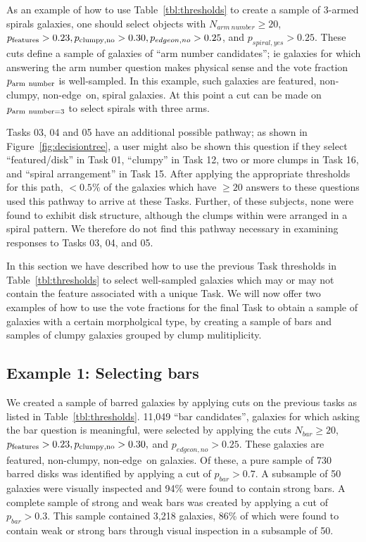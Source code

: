 \documentclass[twocolumn]{aastex6}
\begin{document}
As an example of how to use Table~\ref{tbl:thresholds} to create a sample of 3-armed spirals galaxies, one should select objects with $N_{arm~number} \ge 20$, $p_{\rm features}>0.23, p_{\rm clumpy,no} > 0.30, p_{edgeon,no}>0.25$, and $p_{spiral,yes}>0.25$. These cuts define a sample of galaxies of ``arm number candidates''; ie galaxies for which answering the arm number question makes physical sense and the vote fraction $p_{\rm arm~number}$ is well-sampled. In this example, such galaxies are featured, non-clumpy, non-edge~on, spiral galaxies. At this point a cut can be made on $p_{\rm arm~number=3}$ to select spirals with three arms. 

Tasks 03, 04 and 05 have an additional possible pathway; as shown in Figure~\ref{fig:decisiontree}, a user might also be shown this question if they select ``featured/disk'' in Task 01, ``clumpy'' in Task 12, two or more clumps in Task 16, and ``spiral arrangement'' in Task 15. After applying the appropriate thresholds for this path, $< 0.5\%$ of the galaxies which have $\ge 20$ answers to these questions used this pathway to arrive at these Tasks. Further, of these subjects, none were found to exhibit disk structure, although the clumps within were arranged in a spiral pattern. We therefore do not find this pathway necessary in examining responses to Tasks 03, 04, and 05.

In this section we have described how to use the previous Task thresholds in Table~\ref{tbl:thresholds} to select well-sampled galaxies which may or may not contain the feature associated with a unique Task. We will now offer two examples of how to use the vote fractions for the final Task to obtain a sample of galaxies with a certain morpholgical type, by creating a sample of bars and samples of clumpy galaxies grouped by clump mulitiplicity. 

\subsection{Example 1: Selecting bars} 

We created a sample of barred galaxies by applying cuts on the previous tasks as listed in Table~\ref{tbl:thresholds}. 11,049 ``bar candidates'', galaxies for which asking the bar question is meaningful, were selected by applying the cuts $N_{bar} \ge 20$, $p_{\rm features}>0.23, p_{\rm clumpy,no} > 0.30,$ and $p_{edgeon,no}>0.25$. These galaxies are featured, non-clumpy, non-edge~on galaxies. Of these, a pure sample of 730 barred disks was identified by applying a cut of $p_{bar}>0.7$. A subsample of 50 galaxies were visually inspected and 94\% were found to contain strong bars. A complete sample of strong and weak bars was created by applying a cut of $p_{bar}>0.3$. This sample contained 3,218 galaxies, 86\% of which were found to contain weak or strong bars through visual inspection in a subsample of 50.
\end{document}
